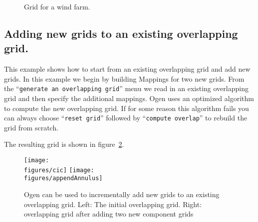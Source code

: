 \documentclass[xcolor=rgb,svgnames,dvipsnames]{article}
\newcommand{\figures}{\homeHenshaw/OvertureFigures}
\newcommand{\ogen}{\OvertureDir/ogen}
\begin{document}
{
\newcommand{\figWidthd}{12cm}
\newcommand{\trimfig}[2]{\trimPlot{#1}{#2}{.0}{.0}{.15}{.3}}
\begin{figure}[hbt]
\begin{center}
\end{center}
\caption{Grid for a wind farm.} \label{fig:ogen}
\end{figure}
}

\clearpage
\subsection{Adding new grids to an existing overlapping grid.}
  This example shows how to start from an existing overlapping grid and add
new grids. In this example we begin by building Mappings for two new grids.
From the ``{\tt generate an overlapping grid}'' menu we read in an existing
overlapping grid and then specify the additional mappings. Ogen uses an optimized algorithm
to compute the new overlapping grid. If for some reason this algorithm fails you can always
choose ``{\tt reset grid}'' followed by ``{\tt compute overlap}'' to rebuild the grid
from scratch.
\begin{multicols}{2}
{\footnotesize
\listinginput[1]{1}{\ogen /appendAnnulus.cmd}
}
\end{multicols}
The resulting grid is shown in figure~\ref{fig:appendAnnulus}.
\begin{figure}[htb]
  \begin{center}
   \texttt{[image: \\figures/cic]}
   \texttt{[image: \\figures/appendAnnulus]}
  \caption{Ogen can be used to incrementally add new grids to an existing overlapping grid. 
       Left: The initial overlapping grid. Right: overlapping grid after adding two new component grids} \label{fig:appendAnnulus}
  \end{center}
\end{figure}
\end{document}
